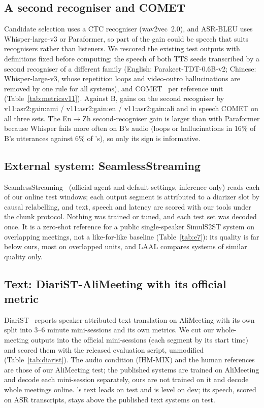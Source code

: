 \ifMetricsV
\subsection{A second recogniser and COMET}
\label{app:metricsv11}
Candidate selection uses a CTC recogniser (wav2vec~2.0), and ASR-BLEU uses Whisper-large-v3 or Paraformer, so part of
the gain could be speech that suits recognisers rather than listeners. We rescored the existing test outputs with
definitions fixed before computing: the speech of both TTS seeds transcribed by a second recogniser of a different
family (English: Parakeet-TDT-0.6B-v2; Chinese: Whisper-large-v3, whose repetition loops and video-outro hallucinations
are removed by one rule for all systems), and COMET~\citep{rei2022comet} per reference unit (Table~\ref{tab:metricsv11}).
Against B, \sys{} gains on the second recogniser by \num{v11:asr2:gain:ami} / \num{v11:asr2:gain:en} /
\num{v11:asr2:gain:ali} and in speech COMET on all three sets. The En$\rightarrow$Zh second-recogniser gain is larger
than with Paraformer because Whisper fails more often on B's audio (loops or hallucinations in 16\% of B's utterances
against 6\% of \sys{}'s), so only its sign is informative.

\fi

\subsection{External system: SeamlessStreaming}
\label{app:e7}
SeamlessStreaming~\citep{seamless2023} (official agent and default settings, inference only) reads each of our online
test windows; each output segment is attributed to a diarizer slot by causal relabelling, and text, speech and latency
are scored with our tools under the chunk protocol. Nothing was trained or tuned, and each test set was decoded once.
It is a zero-shot reference for a public single-speaker SimulS2ST system on overlapping meetings, not a like-for-like
baseline (Table~\ref{tab:e7}): its quality is far below ours, most on overlapped units, and LAAL compares systems of
similar quality only.


\subsection{Text: DiariST-AliMeeting with its official metric}
\label{app:diarist}
DiariST~\citep{yang2024diarist} reports speaker-attributed text translation on AliMeeting with its own split into 3--6
minute mini-sessions and its own metrics. We cut our whole-meeting outputs into the official mini-sessions (each
segment by its start time) and scored them with the released evaluation script, unmodified (Table~\ref{tab:diarist}).
The audio condition (IHM-MIX) and the human references are those of our AliMeeting test; the published systems are
trained on AliMeeting and decode each mini-session separately, ours are not trained on it and decode whole meetings
online. \sys{}'s text leads on test and is level on dev; its speech, scored on ASR transcripts, stays above the
published text systems on test.



